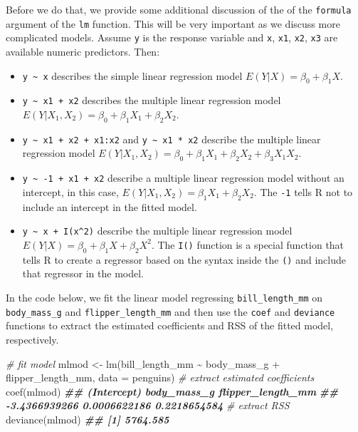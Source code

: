\documentclass[
]{book}
\newenvironment{Shaded}{\begin{snugshade}}{\end{snugshade}}
\newcommand{\AttributeTok}[1]{\textcolor[rgb]{0.77,0.63,0.00}{#1}}
\newcommand{\CommentTok}[1]{\textcolor[rgb]{0.56,0.35,0.01}{\textit{#1}}}
\newcommand{\DocumentationTok}[1]{\textcolor[rgb]{0.56,0.35,0.01}{\textbf{\textit{#1}}}}
\newcommand{\FunctionTok}[1]{\textcolor[rgb]{0.00,0.00,0.00}{#1}}
\newcommand{\NormalTok}[1]{#1}
\newcommand{\OtherTok}[1]{\textcolor[rgb]{0.56,0.35,0.01}{#1}}
\newcommand{\SpecialCharTok}[1]{\textcolor[rgb]{0.00,0.00,0.00}{#1}}
\providecommand{\tightlist}{%
  \setlength{\itemsep}{0pt}\setlength{\parskip}{0pt}}
\theoremstyle{definition}
\theoremstyle{definition}
\theoremstyle{definition}
\theoremstyle{definition}
\theoremstyle{remark}
\begin{document}
Before we do that, we provide some additional discussion of the of the \texttt{formula} argument of the \texttt{lm} function. This will be very important as we discuss more complicated models. Assume \texttt{y} is the response variable and \texttt{x}, \texttt{x1}, \texttt{x2}, \texttt{x3} are available numeric predictors. Then:

\begin{itemize}
\tightlist
\item
  \texttt{y\ \textasciitilde{}\ x} describes the simple linear regression model \(E(Y|X)=\beta_0+\beta_1 X\).
\item
  \texttt{y\ \textasciitilde{}\ x1\ +\ x2} describes the multiple linear regression model \(E(Y|X_1, X_2)=\beta_0+\beta_1 X_1 + \beta_2 X_2\).
\item
  \texttt{y\ \textasciitilde{}\ x1\ +\ x2\ +\ x1:x2} and \texttt{y\ \textasciitilde{}\ x1\ *\ x2} describe the multiple linear regression model
  \(E(Y|X_1, X_2)=\beta_0+\beta_1 X_1 + \beta_2 X_2 + \beta_3 X_1 X_2\).
\item
  \texttt{y\ \textasciitilde{}\ -1\ +\ x1\ +\ x2} describe a multiple linear regression model without an intercept, in this case,
  \(E(Y|X_1, X_2)=\beta_1 X_1 + \beta_2 X_2\). The \texttt{-1} tells R not to include an intercept in the fitted model.
\item
  \texttt{y\ \textasciitilde{}\ x\ +\ I(x\^{}2)} describe the multiple linear regression model \(E(Y|X)=\beta_0+\beta_1 X + \beta_2 X^2\). The \texttt{I()} function is a special function that tells R to create a regressor based on the syntax inside the \texttt{()} and include that regressor in the model.
\end{itemize}

In the code below, we fit the linear model regressing \texttt{bill\_length\_mm} on \texttt{body\_mass\_g} and \texttt{flipper\_length\_mm} and then use the \texttt{coef} and \texttt{deviance} functions to extract the estimated coefficients and RSS of the fitted model, respectively.

\begin{Shaded}
\begin{Highlighting}[]
\CommentTok{\# fit model}
\NormalTok{mlmod }\OtherTok{\textless{}{-}} \FunctionTok{lm}\NormalTok{(bill\_length\_mm }\SpecialCharTok{\textasciitilde{}}\NormalTok{ body\_mass\_g }\SpecialCharTok{+}\NormalTok{ flipper\_length\_mm, }\AttributeTok{data =}\NormalTok{ penguins)}
\CommentTok{\# extract estimated coefficients}
\FunctionTok{coef}\NormalTok{(mlmod)}
\DocumentationTok{\#\#       (Intercept)       body\_mass\_g flipper\_length\_mm }
\DocumentationTok{\#\#     {-}3.4366939266      0.0006622186      0.2218654584}
\CommentTok{\# extract RSS}
\FunctionTok{deviance}\NormalTok{(mlmod)}
\DocumentationTok{\#\# [1] 5764.585}
\end{Highlighting}
\end{Shaded}
\end{document}
